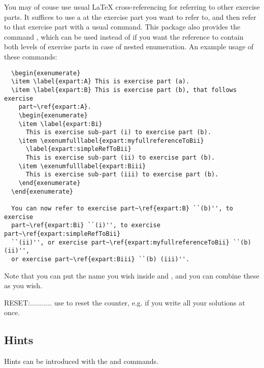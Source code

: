 \documentclass[11pt,a4paper]{article}
\begin{document}
You may of couse use usual \LaTeX{} cross-referencing for referring to other exercise
parts. It suffices to use a  at the exercise part you want to refer to, and
then refer to that exercise part with a usual  command. This package also
provides the command , which can be used instead of
 if you want the reference to contain both levels of exercise parts in case
of nested enumeration. An example usage of these commands:
\begin{pkgverbatim}
\begin{verbatim}
  \begin{exenumerate}
  \item \label{expart:A} This is exercise part (a).
  \item \label{expart:B} This is exercise part (b), that follows exercise
    part~\ref{expart:A}.
    \begin{exenumerate}
    \item \label{expart:Bi}
      This is exercise sub-part (i) to exercise part (b).
    \item \exenumfulllabel{expart:myfullreferenceToBii}
      \label{expart:simpleRefToBii}
      This is exercise sub-part (ii) to exercise part (b).
    \item \exenumfulllabel{expart:Biii}
      This is exercise sub-part (iii) to exercise part (b).
    \end{exenumerate}
  \end{exenumerate}

  You can now refer to exercise part~\ref{expart:B} ``(b)'', to exercise
  part~\ref{expart:Bi} ``(i)'', to exercise part~\ref{expart:simpleRefToBii}
  ``(ii)'', or exercise part~\ref{expart:myfullreferenceToBii} ``(b) (ii)'',
  or exercise part~\ref{expart:Biii} ``(b) (iii)''.

\end{verbatim}
\end{pkgverbatim}
Note that you can put the name you wish inside  and
, and you can combine these as you wish.


RESET:........... use  to reset the counter, e.g. if you write
all your solutions at once.


\subsection{Hints}
\label{sec:Hints}

Hints can be introduced with the  and  commands.
\end{document}
